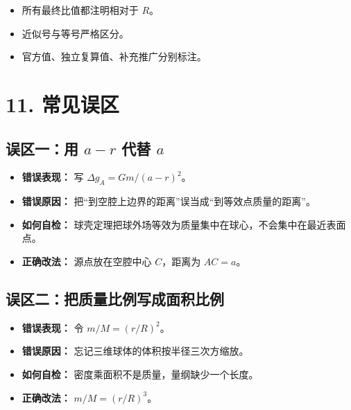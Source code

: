 \documentclass[
  11pt,
  UTF8]{ctexart}
\providecommand{\tightlist}{%
  \setlength{\itemsep}{0pt}\setlength{\parskip}{0pt}}
\begin{document}
\begin{itemize}
\tightlist
\item
  所有最终比值都注明相对于 \(R\)。
\item
  近似号与等号严格区分。
\item
  官方值、独立复算值、补充推广分别标注。
\end{itemize}

\hypertarget{ux5e38ux89c1ux8befux533a}{%
\section{11. 常见误区}\label{ux5e38ux89c1ux8befux533a}}

\hypertarget{ux8befux533aux4e00ux7528-a-r-ux4ee3ux66ff-a}{%
\subsection{\texorpdfstring{误区一：用 \(a-r\) 代替
\(a\)}{误区一：用 a-r 代替 a}}\label{ux8befux533aux4e00ux7528-a-r-ux4ee3ux66ff-a}}

\begin{itemize}
\tightlist
\item
  \textbf{错误表现：} 写 \(Δg_A=Gm/(a-r)^2\)。
\item
  \textbf{错误原因：}
  把``到空腔上边界的距离''误当成``到等效点质量的距离''。
\item
  \textbf{如何自检：}
  球壳定理把球外场等效为质量集中在球心，不会集中在最近表面点。
\item
  \textbf{正确改法：} 源点放在空腔中心 \(C\)，距离为 \(AC=a\)。
\end{itemize}

\hypertarget{ux8befux533aux4e8cux628aux8d28ux91cfux6bd4ux4f8bux5199ux6210ux9762ux79efux6bd4ux4f8b}{%
\subsection{误区二：把质量比例写成面积比例}\label{ux8befux533aux4e8cux628aux8d28ux91cfux6bd4ux4f8bux5199ux6210ux9762ux79efux6bd4ux4f8b}}

\begin{itemize}
\tightlist
\item
  \textbf{错误表现：} 令 \(m/M=(r/R)^2\)。
\item
  \textbf{错误原因：} 忘记三维球体的体积按半径三次方缩放。
\item
  \textbf{如何自检：} 密度乘面积不是质量，量纲缺少一个长度。
\item
  \textbf{正确改法：} \(m/M=(r/R)^3\)。
\end{itemize}
\end{document}
